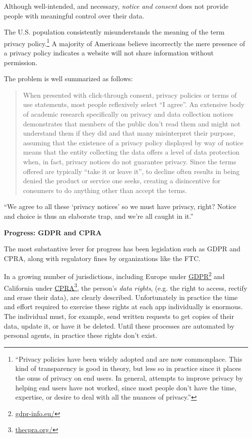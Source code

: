 \documentclass[11pt, oneside]{article}   	%
\newcommand{\hyperfootnote}[1][]{\def\ArgI{{#1}}\hyperfootnoteRelay}
\newcommand\hyperfootnoteRelay[2][]{\href{#1#2}{\ArgI}\footnote{\href{#1#2}{#2}}}
\begin{document}
Although well-intended, and necessary, \emph{notice and consent} does not provide people with meaningful control over their data. 

The U.S. population consistently misunderstands the meaning of the term privacy policy.\footnote{``Privacy policies have been widely adopted and are now commonplace. This kind of transparency is good in theory, but less so in practice since it places the onus of privacy on end users. In general, attempts to improve privacy by helping end users have not worked, since most people don't have the time, expertise, or desire to deal with all the nuances of privacy.''\cite{Hong2023}} A majority of Americans believe incorrectly the mere presence of a privacy policy indicates a website will not share information without permission.\cite{Draper2019} 

The problem is well summarized as follows:
\begin{quote}
	When presented with click-through consent, privacy policies or terms of use statements, most people reflexively select ``I agree''. An extensive body of academic research specifically on privacy and data collection notices demonstrates that members of the public don't read them and might not understand them if they did and that many misinterpret their purpose, assuming that the existence of a privacy policy displayed by way of notice means that the entity collecting the data offers a level of data protection when, in fact, privacy notices do not guarantee privacy. Since the terms offered are typically ``take it or leave it'', to decline often results in being denied the product or service one seeks, creating a disincentive for consumers to do anything other than accept the terms.\cite{Flanagan2020}
\end{quote}

``We agree to all these `privacy notices' so we must have privacy, right? Notice and choice is thus an elaborate trap, and we're all caught in it.''\cite{Richards2021}

\textbf{Progress: GDPR and CPRA}

The most substantive lever for progress has been legislation such as GDPR and CPRA, along with regulatory fines by organizations like the FTC. 

In a growing number of jurisdictions, including Europe under \hyperfootnote[GDPR][https://]{gdpr-info.eu/} and California under \hyperfootnote[CPRA][https://]{thecpra.org/}, the person's \emph{data rights}, (e.g. the right to access, rectify and erase their data), are clearly described. Unfortunately in practice the time and effort required to exercise these rights at each app individually is enormous. The individual must, for example, send written requests to get copies of their data, update it, or have it be deleted. Until these processes are automated by personal agents, in practice these rights don't exist.
\end{document}
